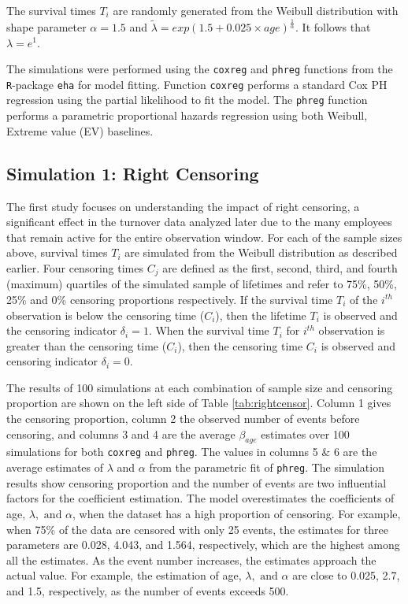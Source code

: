  The survival times $T_i$ are randomly generated from the Weibull distribution with shape parameter $\alpha=1.5$ and $\tilde{\lambda}=exp(1.5 +0.025 \times age)^{\frac{1}{\alpha}}$.  It follows that $\lambda = e^1$.
 
 The simulations were performed using the {\tt coxreg} and {\tt phreg} functions from the {\tt R}-package {\tt eha} \citep{eha} for model fitting.  Function {\tt coxreg} performs a standard Cox PH regression using the partial likelihood to fit the model.  The {\tt phreg} function performs a parametric proportional hazards regression using both Weibull, Extreme value (EV) baselines.
\subsection{Simulation 1: Right Censoring} \label{rightcensor.sim1}

The first study focuses on understanding the impact of right censoring, a significant effect in the turnover data analyzed later due to the many employees that remain active for the entire observation window. For each of the sample sizes above, survival times $T_i$ are simulated from the Weibull distribution as described earlier.  Four censoring times $C_j$ are defined as the first, second, third, and fourth (maximum) quartiles of the simulated sample of lifetimes and refer to 75\%, 50\%, 25\% and 0\% censoring proportions respectively. If the survival time $T_i$ of the $i^{th}$ observation is below the censoring time ($C_i$), then the lifetime $T_i$ is observed and the censoring indicator $\delta_i=1$. When the survival time $T_i$ for $i^{th}$ observation is greater than the censoring time ($C_i$), then the censoring time $C_i$ is observed and censoring indicator $\delta_i = 0$.

The results of 100 simulations at each combination of sample size and censoring proportion are shown on the left side of Table \ref{tab:rightcensor}. Column 1 gives the censoring proportion, column 2 the observed number of events before censoring, and columns 3 and 4 are the average $\beta_{age}$ estimates over 100 simulations for both {\tt coxreg} and {\tt phreg}.  The values in columns 5 \& 6  are the average estimates of $\lambda$ and $\alpha$ from the parametric fit of {\tt phreg}. The simulation results show censoring proportion and the number of events are two influential factors for the coefficient estimation. The model overestimates the coefficients of age, $\lambda, \text{ and } \alpha$, when the dataset has a high proportion of censoring. For example, when 75\% of the data are censored with only 25 events, the estimates for three parameters are 0.028, 4.043, and 1.564, respectively, which are the highest among all the estimates. As the event number increases, the estimates approach the actual value. For example, the estimation of age, $\lambda, \text{ and } \alpha$ are close to 0.025, 2.7, and 1.5, respectively, as the number of events exceeds 500.


